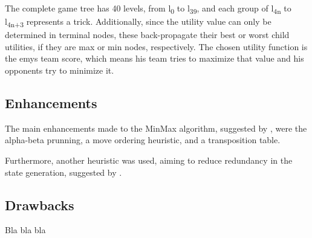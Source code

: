 The complete game tree has 40 levels, from l\textsubscript{0} to l\textsubscript{39}, and each group of l\textsubscript{4n} to l\textsubscript{4n+3} represents a trick.
Additionally, since the utility value can only be determined in terminal nodes, these back-propagate their best or worst child utilities, if they are max or min nodes, respectively.
The chosen utility function is the \ac{emys} team score, which means his team tries to maximize that value and his opponents try to minimize it.


\subsection{Enhancements}

The main enhancements made to the MinMax algorithm, suggested by \citet*{Russell2009}, were the alpha-beta prunning, a move ordering heuristic, and a transposition table.


Furthermore, another heuristic was used, aiming to reduce redundancy in the state generation, suggested by \cite{Buro}.

\subsection{Drawbacks}

Bla bla bla


